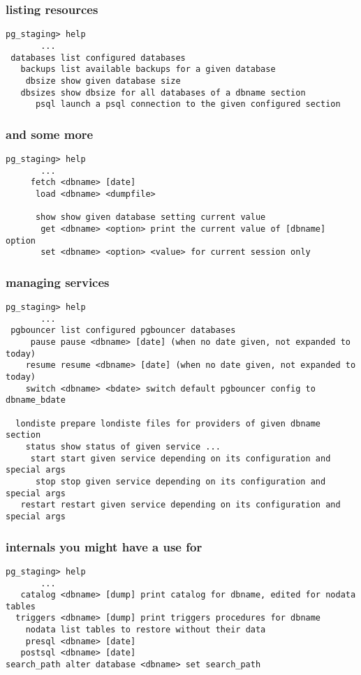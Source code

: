 \documentclass{beamer}
\begin{document}
\begin{frame}[fragile]
  \frametitle{listing resources}

\begin{verbatim}
pg_staging> help
       ...
 databases list configured databases
   backups list available backups for a given database
    dbsize show given database size
   dbsizes show dbsize for all databases of a dbname section
      psql launch a psql connection to the given configured section
\end{verbatim}
\end{frame}

\begin{frame}[fragile]
  \frametitle{and some more}

\begin{verbatim}
pg_staging> help
       ...
     fetch <dbname> [date]
      load <dbname> <dumpfile>

      show show given database setting current value
       get <dbname> <option> print the current value of [dbname] option
       set <dbname> <option> <value> for current session only
\end{verbatim}
\end{frame}

\begin{frame}[fragile]
  \frametitle{managing services}
\begin{verbatim}
pg_staging> help
       ...
 pgbouncer list configured pgbouncer databases
     pause pause <dbname> [date] (when no date given, not expanded to today)
    resume resume <dbname> [date] (when no date given, not expanded to today)
    switch <dbname> <bdate> switch default pgbouncer config to dbname_bdate

  londiste prepare londiste files for providers of given dbname section
    status show status of given service ...
     start start given service depending on its configuration and special args
      stop stop given service depending on its configuration and special args
   restart restart given service depending on its configuration and special args
\end{verbatim}
\end{frame}

\begin{frame}[fragile]
  \frametitle{internals you might have a use for}
\begin{verbatim}
pg_staging> help
       ...
   catalog <dbname> [dump] print catalog for dbname, edited for nodata tables
  triggers <dbname> [dump] print triggers procedures for dbname
    nodata list tables to restore without their data
    presql <dbname> [date]
   postsql <dbname> [date]
search_path alter database <dbname> set search_path
\end{verbatim}
\end{frame}
\end{document}
